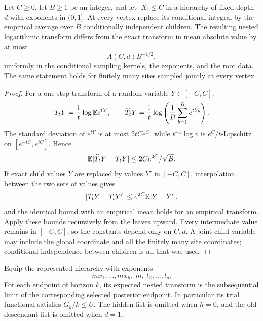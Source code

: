 \begin{lemma}\label{ct:empirical}
Let $C\ge0$, let $B\ge1$ be an integer, and let $|X|\le C$ in a hierarchy of fixed depth $d$ with
exponents in $(0,1]$.  At every vertex replace its conditional integral
by the empirical average over $B$ conditionally independent children.
The resulting nested logarithmic transform differs from the exact
transform in mean absolute value by at most
\[
                            A(C,d)B^{-1/2},
\]
uniformly in the conditional sampling kernels, the exponents, and
the root data.  The same statement holds for finitely many sites
sampled jointly at every vertex.
\end{lemma}

\begin{proof}
For a one-step transform of a random variable $Y\in[-C,C]$,
\[
 T_tY=\frac1t\log\mathbb E e^{tY},
 \qquad
 \widehat T_tY=\frac1t\log\left(\frac1B\sum_{b=1}^B e^{tY_b}\right).
\]
The standard deviation of $e^{tY}$ is at most $2tCe^C$, while
$t^{-1}\log v$ is $e^C/t$-Lipschitz on
$[e^{-tC},e^{tC}]$.  Hence
\begin{equation}\label{ct:one-step-empirical}
                      \mathbb E|\widehat T_tY-T_tY|
                              \le2Ce^{2C}/\sqrt B.
\end{equation}
If exact child values $Y$ are replaced by values $Y'$ in $[-C,C]$,
interpolation between the two sets of values gives
\[
               |T_tY-T_tY'|\le e^{2C}\mathbb E|Y-Y'|,
\]
and the identical bound with an empirical mean holds for an
empirical transform.  Apply these bounds recursively from the
leaves upward.  Every intermediate value remains in $[-C,C]$,
so the constants depend only on $C,d$.  A joint child variable
may include the global coordinate and all the finitely many site
coordinates; conditional independence between children is all that
was used.
\end{proof}

\begin{lemma}\label{ct:endpoint}
Equip the represented hierarchy with exponents
\begin{equation}\label{ct:new-exponents}
                  mx_1,\ldots,mx_h,\ m,\ t_2,\ldots,t_d.
\end{equation}
For each endpoint of horizon $k$, its expected nested transform is
the subsequential limit of the corresponding selected posterior
endpoint.  In particular its trial functional satisfies $G_k/k\le U$.
The hidden list is omitted when $h=0$, and the old descendant list is
omitted when $d=1$.
\end{lemma}

